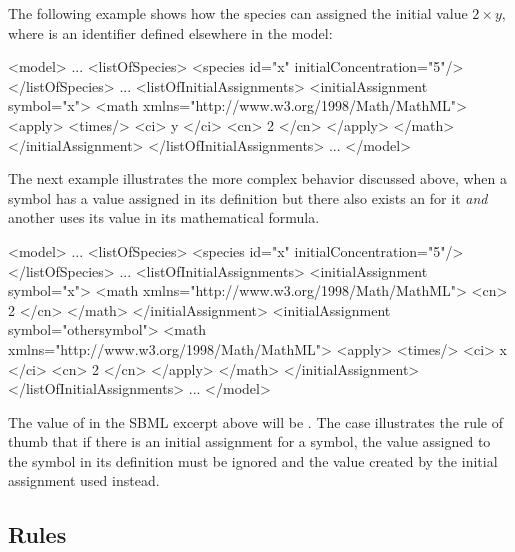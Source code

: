 The following example shows how the species  can assigned
the initial value $2 \times y$, where  is an identifier
defined elsewhere in the model:

\begin{example}
<model>
    ...
    <listOfSpecies>
        <species id="x" initialConcentration="5"/>
    </listOfSpecies>
    ...
    <listOfInitialAssignments>
        <initialAssignment symbol="x">
            <math xmlns="http://www.w3.org/1998/Math/MathML">
                <apply>
                    <times/>
                    <ci> y </ci>
                    <cn> 2 </cn>
                </apply>
            </math>
        </initialAssignment>
    </listOfInitialAssignments>
    ...
</model>
\end{example}

The next example illustrates the more complex behavior discussed
above, when a symbol has a value assigned in its definition but
there also exists an \InitialAssignment for it \emph{and} another
\InitialAssignment uses its value in its mathematical formula.

\begin{example}
<model>
    ...
    <listOfSpecies>
        <species id="x" initialConcentration="5"/>
    </listOfSpecies>
    ...
    <listOfInitialAssignments>
        <initialAssignment symbol="x">
            <math xmlns="http://www.w3.org/1998/Math/MathML">
                <cn> 2 </cn>
            </math>
        </initialAssignment>
        <initialAssignment symbol="othersymbol">
            <math xmlns="http://www.w3.org/1998/Math/MathML">
                <apply>
                    <times/>
                    <ci> x </ci>
                    <cn> 2 </cn>
                </apply>
            </math>
        </initialAssignment>
    </listOfInitialAssignments>
    ...
</model>
\end{example}

The value of  in the SBML excerpt above will be
.  The case illustrates the rule of thumb that if there is
an initial assignment for a symbol, the value assigned to the
symbol in its definition must be ignored and the value created by
the initial assignment used instead.


\subsection{Rules}
\label{sec:rules}

